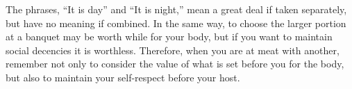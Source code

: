 The phrases,  ``It is day''  and ``It  is night,'' mean  a great deal  if taken
separately, but  have no meaning  if combined. In the  same way, to  choose the
larger portion at a  banquet may be worth while for your body,  but if you want
to maintain social  decencies it is worthless. Therefore, when  you are at meat
with another, remember not only to consider the value of what is set before you
for the body, but also to maintain your self-respect before your host.

